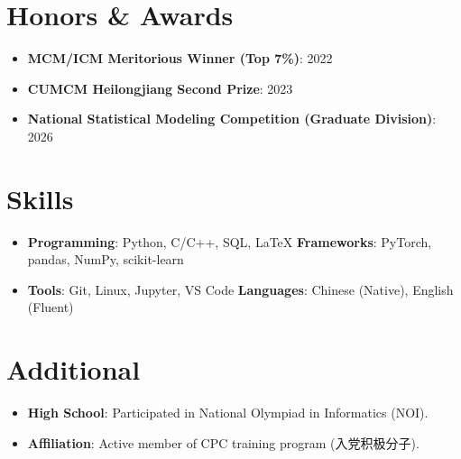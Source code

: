 \documentclass[letterpaper,11pt]{article}
\newcommand{\resumeItem}[2]{
  \item\small{
    \textbf{#1}{: #2 \vspace{-2pt}}
  }
}
\newcommand{\resumeSubItem}[2]{\resumeItem{#1}{#2}\vspace{-4pt}}
\newcommand{\resumeSubHeadingListStart}{\begin{itemize}[leftmargin=*]}
\newcommand{\resumeSubHeadingListEnd}{\end{itemize}}
\begin{document}
\section{Honors \& Awards}
  \resumeSubHeadingListStart
    \resumeSubItem{MCM/ICM Meritorious Winner (Top 7\%)}{2022}
    \resumeSubItem{CUMCM Heilongjiang Second Prize}{2023}
    \resumeSubItem{National Statistical Modeling Competition (Graduate Division)}{2026}
  \resumeSubHeadingListEnd

\section{Skills}
  \resumeSubHeadingListStart
    \item{
      \textbf{Programming}{: Python, C/C++, SQL, LaTeX}
      \hfill
      \textbf{Frameworks}{: PyTorch, pandas, NumPy, scikit-learn}
    }
    \item{
      \textbf{Tools}{: Git, Linux, Jupyter, VS Code}
      \hfill
      \textbf{Languages}{: Chinese (Native), English (Fluent)}
    }
  \resumeSubHeadingListEnd

\section{Additional}
  \resumeSubHeadingListStart
    \resumeSubItem{High School}
      {Participated in National Olympiad in Informatics (NOI).}
    \resumeSubItem{Affiliation}
      {Active member of CPC training program (入党积极分子).}
  \resumeSubHeadingListEnd
\end{document}
